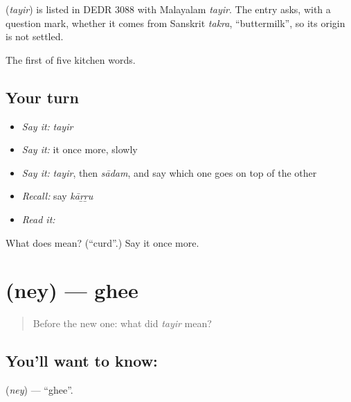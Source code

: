 \begin{cousinweb}
\textbf{} (\emph{tayir}) is listed in DEDR 3088 with Malayalam \emph{tayir}. The entry asks, with a question mark, whether it comes from Sanskrit \emph{takra}, \textquotedblleft{}buttermilk\textquotedblright{}, so its origin is not settled.
\end{cousinweb}

\begin{grammarlens}[title={What you've built}]
The first of five kitchen words.
\end{grammarlens}

\subsection*{Your turn}
\begin{itemize}
\raggedright
  \item \emph{Say it:} \emph{tayir}
  \item \emph{Say it:} it once more, slowly
  \item \emph{Say it:} \emph{tayir}, then \emph{sādam}, and say which one goes on top of the other
  \item \emph{Recall:} say \emph{kāṟṟu}
  \item \emph{Read it:} \textbf{}
\end{itemize}

\begin{tcolorbox}[breakable,colback=teal!4,colframe=teal!35!black,title={Before you move on}]
What does  mean? (\textquotedblleft{}curd\textquotedblright{}.) Say it once more.
\end{tcolorbox}
\section[\texorpdfstring{\ta{நெய்} (ney)}{நெய் (ney)}]{ (ney) — ghee}

\label{lesson:TA-C59-ghee}



\begin{quote}
Before the new one: what did \emph{tayir} mean?
\end{quote}

\subsection*{You'll want to know: }
\textbf{} (\emph{ney}) — \textquotedblleft{}ghee\textquotedblright{}.

